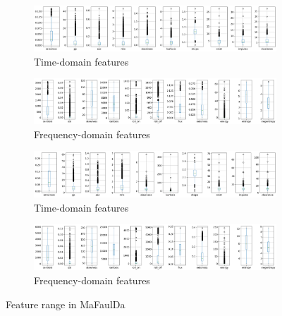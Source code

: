 \begin{figure}[h]
    \centering
    \begin{subfigure}[b]{0.48\textwidth}
        \includegraphics[width=\textwidth]{assets/results/feature-values/features-TD-dim1-A+B.png}
        \caption{Time-domain features}
    \end{subfigure}
    \hfill
    \begin{subfigure}[b]{0.48\textwidth}
        \includegraphics[width=\textwidth]{assets/results/feature-values/features-FD-dim1-A+B.png}
        \caption{Frequency-domain features}
    \end{subfigure}
    \begin{subfigure}[b]{0.48\textwidth}
        \includegraphics[width=\textwidth]{assets/results/feature-values/features-TD-dim3-A+B.png}
        \caption{Time-domain features}
    \end{subfigure}
    \hfill
    \begin{subfigure}[b]{0.48\textwidth}
        \includegraphics[width=\textwidth]{assets/results/feature-values/features-FD-dim3-A+B.png}
        \caption{Frequency-domain features}
    \end{subfigure}
    \caption{Feature range in MaFaulDa}
\end{figure}

